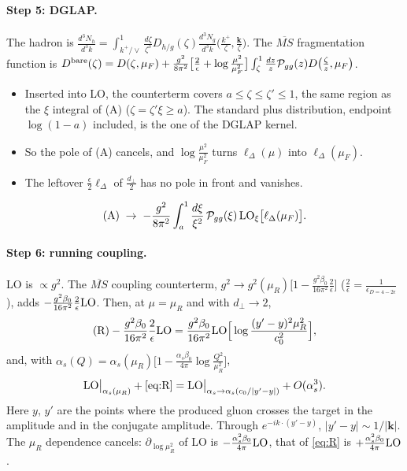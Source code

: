 \documentclass[10pt]{article}
\numberwithin{equation}{section}
\newcommand{\MSb}{\overline{MS}}
\newcommand{\LO}{{\rm LO}}
\begin{document}
\paragraph{Step 5: DGLAP.} The hadron is $\frac{d^3N_h}{d^3k}=\int_{k^+/\vee}^1\frac{d\zeta}{\zeta^3}D_{h/g}(\zeta)\frac{d^3N_g}{d^3k}\big(\frac{k^+}{\zeta},\frac{\mathbf k}{\zeta}\big)$. The $\MSb$ fragmentation function is $D^{\rm bare}(\zeta)=D(\zeta,\mu_F)+\frac{g^2}{8\pi^2}\big[\frac2\epsilon+\log\frac{\mu^2}{\mu_F^2}\big]\int_\zeta^1\frac{dz}{z}\mathcal P_{gg}(z)D\big(\frac\zeta z,\mu_F\big)$.
\begin{itemize}
\item Inserted into LO, the counterterm covers $a\le\zeta\le\zeta'\le1$, the same region as the $\xi$ integral of (A) ($\zeta=\zeta'\xi\ge a$). The standard plus distribution, endpoint $\log(1-a)$ included, is the one of the DGLAP kernel.
\item So the pole of (A) cancels, and $\log\frac{\mu^2}{\mu_F^2}$ turns $\ell_\Delta(\mu)$ into $\ell_\Delta(\mu_F)$.
\item The leftover $\frac\epsilon2\ell_\Delta$ of $\frac{d_\perp}{2}$ has no pole in front and vanishes.
\end{itemize}
\begin{equation}
{\rm (A)}\;\to\;-\frac{g^2}{8\pi^2}\int_a^1\frac{d\xi}{\xi^2}\,\mathcal P_{gg}(\xi)\,\LO_\xi\big[\ell_\Delta(\mu_F)\big].\label{eq:A}
\end{equation}
\paragraph{Step 6: running coupling.} LO is $\propto g^2$. The $\MSb$ coupling counterterm, $g^2\to g^2(\mu_R)\big[1-\frac{g^2\beta_0}{16\pi^2}\frac{2}{\epsilon}\big]$ ($\frac{2}{\epsilon}=\frac{1}{\epsilon_{D=4-2\epsilon}}$), adds $-\frac{g^2\beta_0}{16\pi^2}\frac2\epsilon\LO$. Then, at $\mu=\mu_R$ and with $d_\perp\to2$,
\begin{equation}
{\rm (R)}-\frac{g^2\beta_0}{16\pi^2}\frac2\epsilon\LO=\frac{g^2\beta_0}{16\pi^2}\LO\Big[\log\frac{(y'-y)^2\mu_R^2}{c_0^2}\Big],\label{eq:R}
\end{equation}
and, with $\alpha_s(Q)=\alpha_s(\mu_R)\big[1-\frac{\alpha_s\beta_0}{4\pi}\log\frac{Q^2}{\mu_R^2}\big]$,
\begin{equation}
\LO\big|_{\alpha_s(\mu_R)}+\eqref{eq:R}=\LO\big|_{\alpha_s\to\alpha_s(c_0/|y'-y|)}+O(\alpha_s^3).
\end{equation}
Here $y$, $y'$ are the points where the produced gluon crosses the target in the amplitude and in the conjugate amplitude. Through $e^{-ik\cdot(y'-y)}$, $|y'-y|\sim1/|\mathbf k|$. The $\mu_R$ dependence cancels: $\partial_{\log\mu_R^2}$ of LO is $-\frac{\alpha_s^2\beta_0}{4\pi}\LO$, that of \eqref{eq:R} is $+\frac{\alpha_s^2\beta_0}{4\pi}\LO$.
\end{document}
